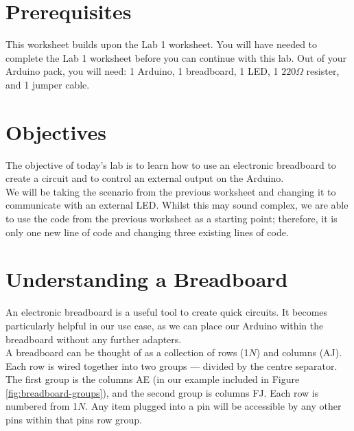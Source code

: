 \documentclass[11pt,a4paper]{article}
\begin{document}
\pagestyle{fancy}

\section*{Prerequisites}
This worksheet builds upon the Lab 1 worksheet. You will have needed to complete the Lab 1 worksheet before you can continue with this lab. Out of your Arduino pack, you will need: 1 Arduino, 1 breadboard, 1 LED, 1 $220\Omega$ resister, and 1 jumper cable.

\section*{Objectives}
The objective of today's lab is to learn how to use an electronic breadboard to create a circuit and to control an external output on the Arduino.\\

\noindent
We will be taking the scenario from the previous worksheet and changing it to communicate with an external LED. Whilst this may sound complex, we are able to use the code from the previous worksheet as a starting point; therefore, it is only one new line of code and changing three existing lines of code.

\section*{Understanding a Breadboard}
An electronic breadboard is a useful tool to create quick circuits. It becomes particularly helpful in our use case, as we can place our Arduino within the breadboard without any further adapters.\\

\noindent
A breadboard can be thought of as a collection of rows (1\textrightarrow $N$) and columns (A\textrightarrow J). Each row is wired together into two groups --- divided by the centre separator. The first group is the columns A\textrightarrow E (in our example included in Figure \ref{fig:breadboard-groups}), and the second group is columns F\textrightarrow J. Each row is numbered from 1\textrightarrow $N$. Any item plugged into a pin will be accessible by any other pins within that pins row group.\\
\end{document}
